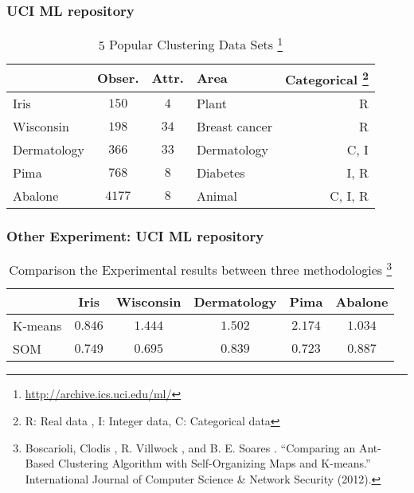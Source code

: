 \begin{frame}
    \frametitle{UCI ML repository}
    \begin{table}[htbp]
        \centering
        \caption{$5$ Popular Clustering Data Sets 
        \footnote[1]{\url{http://archive.ics.uci.edu/ml/}}}
        \label{table1}
        \begin{tabular}{l|cclr}  
            \toprule
                        & Obser.& Attr.     & Area          & Categorical \footnote[2]{R: Real data , I: Integer data, C: Categorical data}  \\
            \midrule
            Iris        & $150$   & $4$         & Plant         & R       \\
            Wisconsin   & $198$   & $34$        & Breast cancer & R       \\
            Dermatology & $366$   & $33$        & Dermatology   & C, I    \\
            Pima        & $768$   & $8$         & Diabetes      & I, R    \\
            Abalone     & $4177$  & $8$         & Animal        & C, I, R \\
            \bottomrule
        \end{tabular}
    \end{table}
\end{frame}
\begin{frame}
    \frametitle{Other Experiment: UCI ML repository}    
    \begin{table}[htbp]
        \centering
        \caption{Comparison the Experimental results between three methodologies
        \footnote[1]{Boscarioli, Clodis , R. Villwock , and B. E. Soares . ``Comparing an Ant-Based Clustering Algorithm with Self-Organizing Maps and K-means.'' International Journal of Computer Science \& Network Security (2012).}}
        \label{table1}
        \begin{tabular}{l|ccccc}  
            \toprule
            &  Iris &  Wisconsin &  Dermatology & Pima & Abalone \\ 
            \midrule
            K-means & $0.846$ & $1.444$ & $1.502$ & $2.174$ & $1.034$ \\
            SOM &  $0.749$&  $0.695$ & $0.839$&  $0.723$&  $0.887$\\
            \bottomrule
        \end{tabular}
    \end{table}

\end{frame}